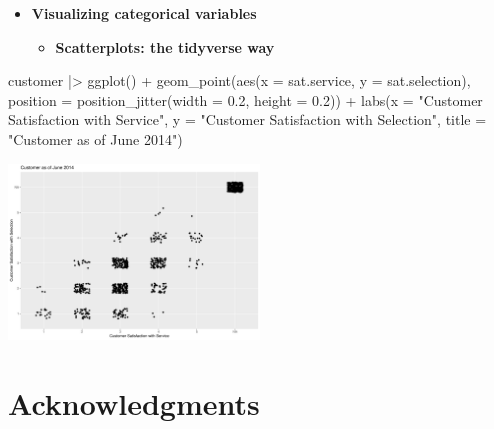 \documentclass[
  ignorenonframetext,
]{beamer}
\newenvironment{Shaded}{\begin{snugshade}}{\end{snugshade}}
\newcommand{\AttributeTok}[1]{\textcolor[rgb]{0.40,0.45,0.13}{#1}}
\newcommand{\FloatTok}[1]{\textcolor[rgb]{0.68,0.00,0.00}{#1}}
\newcommand{\FunctionTok}[1]{\textcolor[rgb]{0.28,0.35,0.67}{#1}}
\newcommand{\NormalTok}[1]{\textcolor[rgb]{0.00,0.23,0.31}{#1}}
\newcommand{\SpecialCharTok}[1]{\textcolor[rgb]{0.37,0.37,0.37}{#1}}
\newcommand{\StringTok}[1]{\textcolor[rgb]{0.13,0.47,0.30}{#1}}
\providecommand{\tightlist}{%
  \setlength{\itemsep}{0pt}\setlength{\parskip}{0pt}}\usepackage{longtable,booktabs,array}
\begin{document}
\begin{frame}[fragile]{}
\label{section-27}
\begin{itemize}
\item
  \textbf{Visualizing categorical variables}

  \begin{itemize}
  \tightlist
  \item
    \textbf{Scatterplots: the tidyverse way}
  \end{itemize}
\end{itemize}

\tiny

\begin{Shaded}
\begin{Highlighting}[]
\NormalTok{customer }\SpecialCharTok{|\textgreater{}} 
  \FunctionTok{ggplot}\NormalTok{() }\SpecialCharTok{+}
  \FunctionTok{geom\_point}\NormalTok{(}\FunctionTok{aes}\NormalTok{(}\AttributeTok{x =}\NormalTok{ sat.service, }\AttributeTok{y =}\NormalTok{ sat.selection), }
             \AttributeTok{position =} \FunctionTok{position\_jitter}\NormalTok{(}\AttributeTok{width =} \FloatTok{0.2}\NormalTok{, }\AttributeTok{height =} \FloatTok{0.2}\NormalTok{)) }\SpecialCharTok{+}
  \FunctionTok{labs}\NormalTok{(}\AttributeTok{x =} \StringTok{"Customer Satisfaction with Service"}\NormalTok{,}
       \AttributeTok{y =} \StringTok{"Customer Satisfaction with Selection"}\NormalTok{,}
       \AttributeTok{title =} \StringTok{"Customer as of June 2014"}\NormalTok{)}
\end{Highlighting}
\end{Shaded}

\begin{center}
\includegraphics[width=0.5\textwidth,height=\textheight]{004_relationships_between_continuous_variables_files/figure-beamer/unnamed-chunk-27-1.pdf}
\end{center}
\end{frame}

\section{Acknowledgments}\label{acknowledgments}
\end{document}
